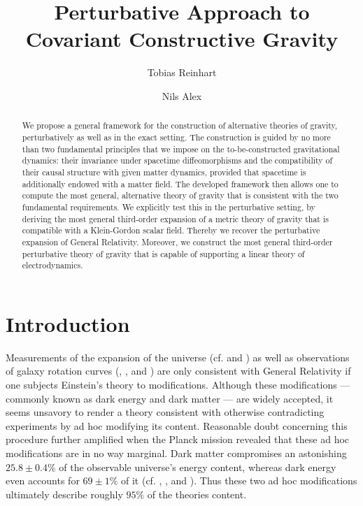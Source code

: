 \documentclass[%
 reprint,
nofootinbib,
 amsmath,amssymb,
 aps,
 prd,
floatfix,
]{revtex4-2}
\begin{document}

\title{Perturbative Approach to Covariant Constructive Gravity}

\author{Tobias Reinhart}
\author{Nils Alex}


\begin{abstract}
We propose a general framework for the construction of alternative theories of gravity, perturbatively as well as in the exact setting. The construction is guided by no more than two fundamental principles that we impose on the to-be-constructed gravitational dynamics: their invariance under spacetime diffeomorphisms and the compatibility of their causal structure with given matter dynamics, provided that spacetime is additionally endowed with a matter field. The developed framework then allows one to compute the most general, alternative theory of gravity that is consistent with the two fundamental requirements. We explicitly test this in the perturbative setting, by deriving the most general third-order expansion of a metric theory of gravity that is compatible with a Klein-Gordon scalar field. Thereby we recover the perturbative expansion of General Relativity. Moreover, we construct the most general third-order perturbative theory of gravity that is capable of supporting a linear theory of electrodynamics.
\end{abstract}

\maketitle

\section{Introduction}
Measurements of the expansion of the universe (cf. \cite{1999ApJ...517..565P} and \cite{1998AJ....116.1009R}) as well as observations of galaxy rotation curves (\cite{1970ApJ...160..811F}, \cite{1970ApJ...159..379R}, and \cite{1980ApJ...238..471R}) are only consistent with General Relativity if one subjects Einstein's theory to modifications. Although these modifications --- commonly known as dark energy and dark matter --- are widely accepted, it seems unsavory to render a theory consistent with otherwise contradicting experiments by ad hoc modifying its content. Reasonable doubt concerning this procedure further amplified when the Planck mission revealed that these ad hoc modifications are in no way marginal. Dark matter compromises an astonishing $ 25.8\pm0.4\%$ of the observable universe's energy content, whereas dark energy even accounts for $ 69 \pm 1 \%$ of it (cf. \cite{Planck13_1}, \cite{Planck13_2}, \cite{Planck15} and \cite{Planck18}). Thus these two ad hoc modifications ultimately describe roughly $95\%$ of the theories content. 
\end{document}
